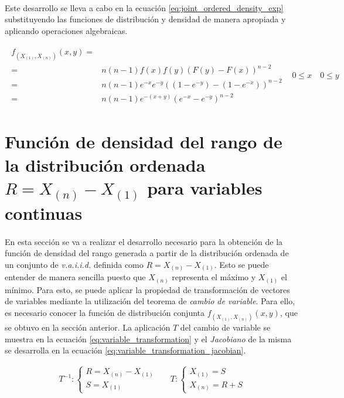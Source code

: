 \documentclass{article}
\begin{document}
      \paragraph{}
      Este desarrollo se lleva a cabo en la ecuación \eqref{eq:joint_ordered_density_exp} substituyendo las funciones de distribución y densidad de manera apropiada y aplicando operaciones algebraicas.

      \begin{align}
        \label{eq:joint_ordered_density_exp}
        \begin{split}
          f_{(X_{(1)}, X_{(n)})} (x,y) =& \\
          =& n(n-1)f(x)f(y)(F(y) - F(x))^{n-2} \\
          =& n  (n-1) e^{-x} e^{-y} ( (1 - e^{-y}) - (1 - e^{-x}) )^{n-2} \\
          =& n  (n-1) e^{-(x+y)} ( e^{-x} - e^{-y} )^{n-2}
        \end{split} & 0 \leq x \quad 0 \leq y
      \end{align}

  \section{Función de densidad del rango de la distribución ordenada $R = X_{(n)} - X_{(1)}$ para variables continuas}
  \label{sec:e2}

    \paragraph{}
    En esta sección se va a realizar el desarrollo necesario para la obtención de la función de densidad del rango generada a partir de la distribución ordenada de un conjunto de \emph{v.a.i.i.d.} definida como $R = X_{(n)} - X_{(1)}$. Esto se puede entender de manera sencilla puesto que $X_{(n)}$ representa el máximo y $X_{(1)}$ el mínimo. Para esto, se puede aplicar la propiedad de transformación de vectores de variables mediante la utilización del teorema de \emph{cambio de variable}. Para ello, es necesario conocer la función de distribución conjunta $f_{(X_{(1)}, X_{(n)})}(x,y)$, que se obtuvo en la sección anterior. La aplicación $T$ del cambio de variable se muestra en la ecuación \eqref{eq:variable_transformation} y el \emph{Jacobiano} de la misma se desarrolla en la ecuación \eqref{eq:variable_transformation_jacobian}.

    \begin{align}
    \label{eq:variable_transformation}
      T^{-1}:
      \begin{cases}
        R = X_{(n)} - X_{(1)} \\
        S = X_{(1)}
      \end{cases} &&
      T:
      \begin{cases}
        X_{(1)} = S \\
        X_{(n)} = R + S
      \end{cases}
    \end{align}
\end{document}
